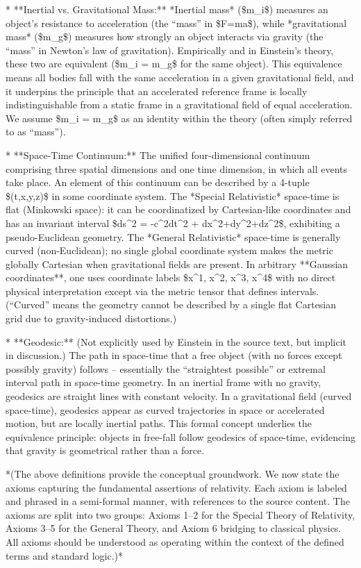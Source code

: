 \documentclass{article}
\begin{document}
* **Inertial vs. Gravitational Mass:** *Inertial mass* (\$m\_i\$) measures an object’s resistance to acceleration (the “mass” in \$F=ma\$), while *gravitational mass* (\$m\_g\$) measures how strongly an object interacts via gravity (the “mass” in Newton’s law of gravitation). Empirically and in Einstein’s theory, these two are equivalent (\$m\_i = m\_g\$ for the same object). This equivalence means all bodies fall with the same acceleration in a given gravitational field, and it underpins the principle that an accelerated reference frame is locally indistinguishable from a static frame in a gravitational field of equal acceleration. We assume \$m\_i = m\_g\$ as an identity within the theory (often simply referred to as “mass”).

* **Space-Time Continuum:** The unified four-dimensional continuum comprising three spatial dimensions and one time dimension, in which all events take place. An element of this continuum can be described by a 4-tuple \$(t,x,y,z)\$ in some coordinate system. The *Special Relativistic* space-time is flat (Minkowski space): it can be coordinatized by Cartesian-like coordinates and has an invariant interval \$ds^2 = -c^2dt^2 + dx^2+dy^2+dz^2\$, exhibiting a pseudo-Euclidean geometry. The *General Relativistic* space-time is generally curved (non-Euclidean); no single global coordinate system makes the metric globally Cartesian when gravitational fields are present. In arbitrary **Gaussian coordinates**, one uses coordinate labels \$x^1, x^2, x^3, x^4\$ with no direct physical interpretation except via the metric tensor that defines intervals. (“Curved” means the geometry cannot be described by a single flat Cartesian grid due to gravity-induced distortions.)

* **Geodesic:** (Not explicitly used by Einstein in the source text, but implicit in discussion.) The path in space-time that a free object (with no forces except possibly gravity) follows – essentially the “straightest possible” or extremal interval path in space-time geometry. In an inertial frame with no gravity, geodesics are straight lines with constant velocity. In a gravitational field (curved space-time), geodesics appear as curved trajectories in space or accelerated motion, but are locally inertial paths. This formal concept underlies the equivalence principle: objects in free-fall follow geodesics of space-time, evidencing that gravity is geometrical rather than a force.

*(The above definitions provide the conceptual groundwork. We now state the axioms capturing the fundamental assertions of relativity. Each axiom is labeled and phrased in a semi-formal manner, with references to the source content. The axioms are split into two groups: Axioms 1–2 for the Special Theory of Relativity, Axioms 3–5 for the General Theory, and Axiom 6 bridging to classical physics. All axioms should be understood as operating within the context of the defined terms and standard logic.)*
\end{document}
